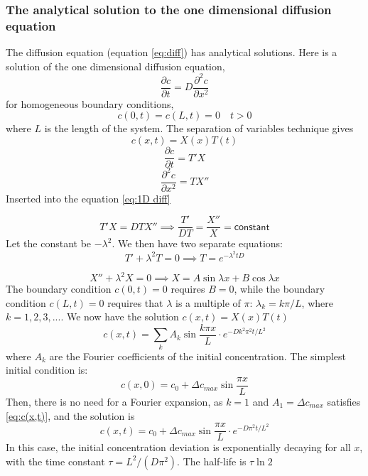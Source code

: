 \documentclass{article}
\begin{document}
\subsubsection{The analytical solution to the one dimensional diffusion equation}\label{analytical solution}
The diffusion equation (equation \ref{eq:diff}) has analytical solutions. Here is a solution of the one dimensional diffusion equation,
\begin{equation}\label{eq:1D diff}
\frac{\partial c}{\partial t} = D\frac{\partial^2 c}{\partial x^2}
\end{equation}
for homogeneous boundary conditions, 
$$c(0,t) = c(L,t)=0 \quad t>0$$ where $L$ is the length of the system. The separation of variables technique gives 
\begin{equation*}
c(x,t) = X(x)T(t)
\end{equation*}
\begin{equation*}
\frac{\partial c}{\partial t} = T'X
\end{equation*}
\begin{equation*}
\frac{\partial^2 c}{\partial x^2} = TX''
\end{equation*}
Inserted into the equation \ref{eq:1D diff}

\begin{equation*}
T'X  = DTX''\implies \frac{T'}{DT} = \frac{X''}{X} =\mathsf{ constant}
\end{equation*}
Let the constant be $-\lambda ^2$. We then have two separate equations:
\begin{equation*}
T' + \lambda^2 T = 0 \implies T=e^{-\lambda^2 tD}
\end{equation*}

\begin{equation*}
X'' + \lambda^2X = 0 \implies X=A \sin \lambda x + B\cos \lambda x
\end{equation*}
The boundary condition $c(0,t) = 0$ requires $B=0$, while the boundary condition $c(L,t)=0$ requires that $\lambda$ is a multiple of $\pi$: $\lambda_k = k\pi /L$, where $k = 1,2,3,...$. 
We now have the solution $c(x,t)=X(x)T(t)$
\begin{equation}\label{eq:c(x,t)}
c(x,t) = \sum_k A_k \sin \frac{k \pi x}{L}\cdot e^{-Dk^2\pi^2 t /L^2}
\end{equation}
where $A_k$ are the Fourier coefficients of the initial concentration.
The simplest initial condition is: 
$$c(x,0) =c_0 +  \Delta c_{max}\sin{\frac{\pi x}{L}}$$
Then, there is no need for a Fourier expansion, as $k=1$ and $A_1 = \Delta c_{max}$ satisfies \ref{eq:c(x,t)}, and the solution is
\begin{equation*}
c(x,t) =c_0 + \Delta c_{max} \sin \frac{ \pi x}{L}\cdot e^{-D\pi^2 t /L^2}
\end{equation*}
In this case, the initial concentration deviation is exponentially  decaying for all $x$, with the time constant $\tau = L^2/(D\pi^2)$. The half-life is $\tau \ln 2$
\end{document}
